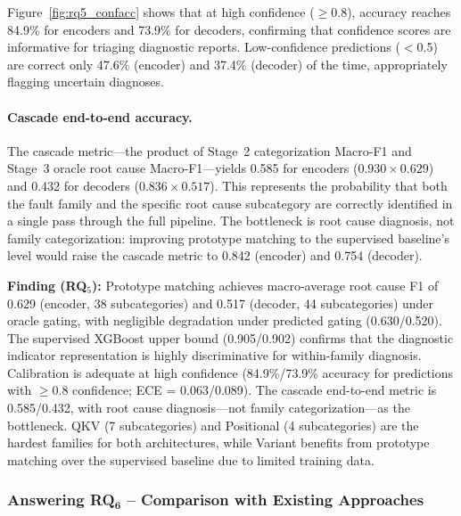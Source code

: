 Figure~\ref{fig:rq5_confacc} shows that at high confidence ($\geq$0.8), accuracy reaches 84.9\% for encoders and 73.9\% for decoders, confirming that confidence scores are informative for triaging diagnostic reports. Low-confidence predictions ($<$0.5) are correct only 47.6\% (encoder) and 37.4\% (decoder) of the time, appropriately flagging uncertain diagnoses.

\paragraph{Cascade end-to-end accuracy.}
The cascade metric---the product of Stage~2 categorization Macro-F1 and Stage~3 oracle root cause Macro-F1---yields 0.585 for encoders ($0.930 \times 0.629$) and 0.432 for decoders ($0.836 \times 0.517$). This represents the probability that both the fault family and the specific root cause subcategory are correctly identified in a single pass through the full pipeline. The bottleneck is root cause diagnosis, not family categorization: improving prototype matching to the supervised baseline's level would raise the cascade metric to 0.842 (encoder) and 0.754 (decoder).

\begin{tcolorbox}[colback=gray!3, colframe=gray!50, boxrule=0.3pt, left=4pt, right=4pt, top=3pt, bottom=3pt]
\textbf{Finding (RQ$_5$):} Prototype matching achieves macro-average root cause F1 of 0.629 (encoder, 38 subcategories) and 0.517 (decoder, 44 subcategories) under oracle gating, with negligible degradation under predicted gating (0.630/0.520). The supervised XGBoost upper bound (0.905/0.902) confirms that the diagnostic indicator representation is highly discriminative for within-family diagnosis. Calibration is adequate at high confidence (84.9\%/73.9\% accuracy for predictions with $\geq$0.8 confidence; ECE = 0.063/0.089). The cascade end-to-end metric is 0.585/0.432, with root cause diagnosis---not family categorization---as the bottleneck. QKV (7 subcategories) and Positional (4 subcategories) are the hardest families for both architectures, while Variant benefits from prototype matching over the supervised baseline due to limited training data.
\end{tcolorbox}

\subsubsection{\textbf{Answering RQ$\mathbf{_6}$} -- Comparison with Existing Approaches}
\label{sec:defaultpp_rq6}

